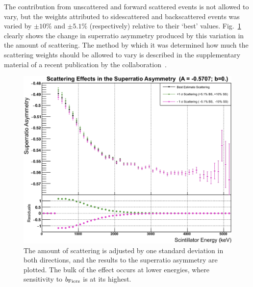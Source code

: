 The contribution from unscattered and forward scattered events is not allowed to vary, but the weights attributed to sidescattered and backscattered events was varied by $\pm 10\%$ and $\pm 5.1\%$ (respectively) relative to their `best' values.  Fig.~\ref{fig:asymmetry_scattering} clearly shows the change in superratio asymmetry produced by this variation in the amount of scattering.  The method by which it was determined how much the scattering weights should be allowed to vary is described in the supplementary material of a recent publication by the collaboration~\cite{ben_Abeta}.
\begin{figure}[h!tb]
	\centering
	\includegraphics[width=.999\linewidth]
	{Figures/ScatteringEstimate.png}
%
	\caption[Scattering Effects in the Asymmetry]{The amount of scattering is adjusted by one standard deviation in both directions, and the results to the superratio asymmetry are plotted.  The bulk of the effect occurs at lower energies, where sensitivity to $b_{\mathrm{Fierz}}$ is at its highest.}	
	\label{fig:asymmetry_scattering}
\end{figure}
